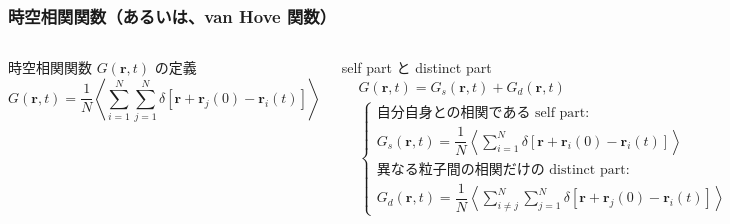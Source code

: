 \documentclass[12pt, dvipdfmx]{beamer}
\begin{document}
\begin{frame}
\frametitle{時空相関関数（あるいは、van Hove 関数）}
\vspace{-2mm}
\begin{columns}[T, totalwidth=\linewidth]
\begin{block}{時空相関関数 $G(\bm{r}, t)$ の定義}
\vspace{-4mm}
\scriptsize
\begin{equation*}
G(\bm{r}, t) = \dfrac{1}{N}\left\langle \sum_{i=1}^{N} \sum_{j=1}^{N} \delta[\bm{r} + \bm{r}_j(0) - \bm{r}_i(t)] \right\rangle
\end{equation*}
\normalsize
\end{block}
\vspace{-1mm}
\begin{block}{self part と distinct part}
\vspace{-4mm}
\scriptsize
\begin{align*}
	&G(\bm{r}, t) = G_s(\bm{r}, t) + G_d(\bm{r}, t) \\
	&\begin{cases}
	\text{自分自身との相関である self part:}\\
	G_s(\bm{r}, t) = \dfrac{1}{N}\left\langle \displaystyle \sum_{i=1}^{N} \delta[\bm{r} + \bm{r}_i(0) - \bm{r}_i(t)] \right\rangle \\[12pt]
	\text{異なる粒子間の相関だけの distinct part:}\\
	G_d(\bm{r}, t) = \dfrac{1}{N}\left\langle \displaystyle \sum_{i \neq j}^{N} \displaystyle \sum_{j=1}^{N} \delta[\bm{r} + \bm{r}_j(0) - \bm{r}_i(t)] \right\rangle
 	\end{cases}
\end{align*}
\normalsize
\end{block}

\includegraphics[width=\columnwidth]{./fig/G(rt).pdf}


\end{columns}
\end{frame}
\end{document}
